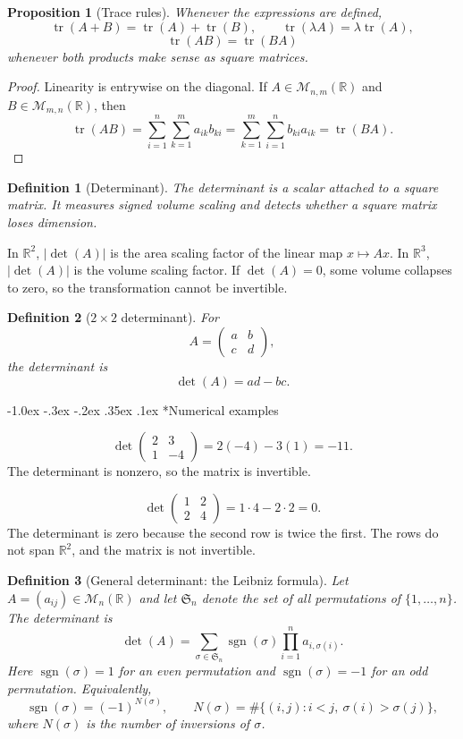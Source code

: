 \documentclass[10pt]{article}
\makeatletter
\renewcommand\subsection{\@startsection{subsection}{2}{\z@}%
  {-1.0ex \@plus -.3ex \@minus -.2ex}%
  {.35ex \@plus .1ex}%
  {\normalfont\normalsize\bfseries}}
\theoremstyle{compactdefinition}
\newtheorem{definition}{Definition}[section]
\theoremstyle{compactproposition}
\newtheorem{proposition}{Proposition}[section]
\newcommand{\R}{\mathbb{R}}
\newcommand{\M}{\mathcal{M}}
\newcommand{\tr}{\operatorname{tr}}
\makeatother
\begin{document}
\begin{proposition}[Trace rules]
Whenever the expressions are defined,
\[
\tr(A+B)=\tr(A)+\tr(B),
\qquad
\tr(\lambda A)=\lambda\tr(A),
\]
\[
\tr(AB)=\tr(BA)
\]
whenever both products make sense as square matrices.
\end{proposition}

\begin{proof}
Linearity is entrywise on the diagonal. If $A\in\M_{n,m}(\R)$ and
$B\in\M_{m,n}(\R)$, then
\[
\tr(AB)=\sum_{i=1}^n\sum_{k=1}^m a_{ik}b_{ki}
=\sum_{k=1}^m\sum_{i=1}^n b_{ki}a_{ik}
=\tr(BA).
\]
\end{proof}

\begin{definition}[Determinant]
The determinant is a scalar attached to a square matrix. It measures signed
volume scaling and detects whether a square matrix loses dimension.
\end{definition}

In $\R^2$, $|\det(A)|$ is the area scaling factor of the linear map $x\mapsto
Ax$. In $\R^3$, $|\det(A)|$ is the volume scaling factor. If $\det(A)=0$, some
volume collapses to zero, so the transformation cannot be invertible.

\begin{definition}[$2\times2$ determinant]
For
\[
A=
\begin{pmatrix}
a&b\\
c&d
\end{pmatrix},
\]
the determinant is
\[
\det(A)=ad-bc.
\]
\end{definition}

\subsection*{Numerical examples}

\[
\det\begin{pmatrix}2&3\\1&-4\end{pmatrix}
=2(-4)-3(1)=-11.
\]
The determinant is nonzero, so the matrix is invertible.

\[
\det\begin{pmatrix}1&2\\2&4\end{pmatrix}
=1\cdot4-2\cdot2=0.
\]
The determinant is zero because the second row is twice the first. The rows do
not span $\R^2$, and the matrix is not invertible.

\begin{definition}[General determinant: the Leibniz formula]
Let $A=(a_{ij})\in\M_n(\R)$ and let $\mathfrak S_n$ denote the set of all
permutations of $\{1,\ldots,n\}$. The determinant is
\[
\boxed{
\det(A)
=\sum_{\sigma\in\mathfrak S_n}
\operatorname{sgn}(\sigma)
\prod_{i=1}^n a_{i,\sigma(i)}
}.
\]
Here $\operatorname{sgn}(\sigma)=1$ for an even permutation and
$\operatorname{sgn}(\sigma)=-1$ for an odd permutation. Equivalently,
\[
\operatorname{sgn}(\sigma)=(-1)^{N(\sigma)},
\qquad
N(\sigma)=\#\{(i,j):i<j,\ \sigma(i)>\sigma(j)\},
\]
where $N(\sigma)$ is the number of inversions of $\sigma$.
\end{definition}
\end{document}
